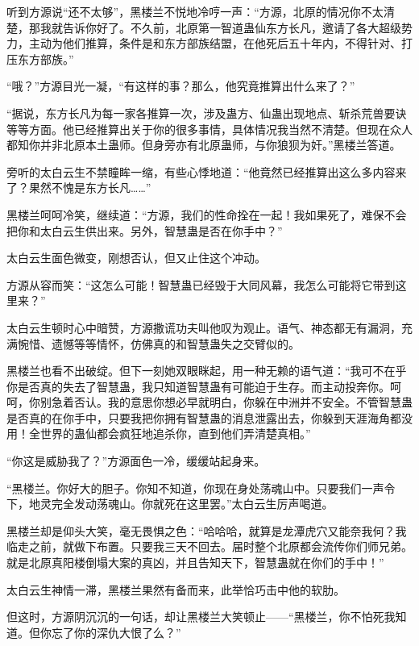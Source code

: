 
\begin{this_body}



听到方源说“还不太够”，黑楼兰不悦地冷哼一声：“方源，北原的情况你不太清楚，那我就告诉你好了。不久前，北原第一智道蛊仙东方长凡，邀请了各大超级势力，主动为他们推算，条件是和东方部族结盟，在他死后五十年内，不得针对、打压东方部族。”

“哦？”方源目光一凝，“有这样的事？那么，他究竟推算出什么来了？”

“据说，东方长凡为每一家各推算一次，涉及蛊方、仙蛊出现地点、斩杀荒兽要诀等等方面。他已经推算出关于你的很多事情，具体情况我当然不清楚。但现在众人都知你并非北原本土蛊师。但身旁亦有北原蛊师，与你狼狈为奸。”黑楼兰答道。

旁听的太白云生不禁瞳眸一缩，有些心悸地道：“他竟然已经推算出这么多内容来了？果然不愧是东方长凡……”

黑楼兰呵呵冷笑，继续道：“方源，我们的性命拴在一起！我如果死了，难保不会把你和太白云生供出来。另外，智慧蛊是否在你手中？”

太白云生面色微变，刚想否认，但又止住这个冲动。

方源从容而笑：“这怎么可能！智慧蛊已经毁于大同风幕，我怎么可能将它带到这里来？”

太白云生顿时心中暗赞，方源撒谎功夫叫他叹为观止。语气、神态都无有漏洞，充满惋惜、遗憾等等情怀，仿佛真的和智慧蛊失之交臂似的。

黑楼兰也看不出破绽。但下一刻她双眼眯起，用一种无赖的语气道：“我可不在乎你是否真的失去了智慧蛊，我只知道智慧蛊有可能迫于生存。而主动投奔你。呵呵，你别急着否认。我的意思你想必早就明白，你躲在中洲并不安全。不管智慧蛊是否真的在你手中，只要我把你拥有智慧蛊的消息泄露出去，你躲到天涯海角都没用！全世界的蛊仙都会疯狂地追杀你，直到他们弄清楚真相。”

“你这是威胁我了？”方源面色一冷，缓缓站起身来。

“黑楼兰。你好大的胆子。你知不知道，你现在身处荡魂山中。只要我们一声令下，地灵完全发动荡魂山。你就死在这里罢。”太白云生厉声喝道。

黑楼兰却是仰头大笑，毫无畏惧之色：“哈哈哈，就算是龙潭虎穴又能奈我何？我临走之前，就做下布置。只要我三天不回去。届时整个北原都会流传你们师兄弟。就是北原真阳楼倒塌大案的真凶，并且告知天下，智慧蛊就在你们的手中！”

太白云生神情一滞，黑楼兰果然有备而来，此举恰巧击中他的软肋。

但这时，方源阴沉沉的一句话，却让黑楼兰大笑顿止——“黑楼兰，你不怕死我知道。但你忘了你的深仇大恨了么？”


\end{this_body}
